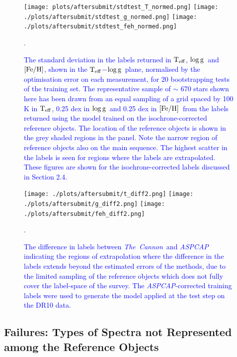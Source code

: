\documentclass[12pt, preprint]{aastex}
\newcommand{\tc}{\textsl{The~Cannon}}
\newcommand{\aspcap}{\textsl{ASPCAP}}
\newcommand{\teff}{\mbox{$\rm T_{eff}$}}
\newcommand{\feh}{\mbox{$\rm [Fe/H]$}}
\newcommand{\logg}{\mbox{$\rm \log g$}}
\begin{document}
\begin{figure}[!h]
\centering
  \texttt{[image: plots/aftersubmit/stdtest\_T\_normed.png]}
    \texttt{[image: ./plots/aftersubmit/stdtest\_g\_normed.png]}
    \texttt{[image: ./plots/aftersubmit/stdtest\_feh\_normed.png]}
    \caption{\textcolor{blue}{The standard deviation in the labels returned in \teff, \logg\ and \feh, shown in the \teff$-$\logg\ plane, normalised by the optimisation error on each measurement, for 20 bootstrapping tests of the training set. The representative sample of $\sim$ 670 stars shown here has been drawn from an equal sampling of a grid spaced by 100 K in \teff, 0.25 dex in \logg\ and 0.25 dex in \feh\ from the labels returned using the model trained on the isochrone-corrected reference objects. The location of the reference objects is shown in the grey shaded regions in the panel. Note the narrow region of reference objects also on the main sequence. The highest scatter in the labels is seen for regions where the labels are extrapolated. These figures are shown for the isochrone-corrected labels discussed in Section 2.4.}}
    \label{fig:sigma}.
\end{figure}



\begin{figure}[!h]
\centering
  \texttt{[image: ./plots/aftersubmit/t\_diff2.png]}
    \texttt{[image: ./plots/aftersubmit/g\_diff2.png]}
    \texttt{[image: ./plots/aftersubmit/feh\_diff2.png]}
    \caption{\textcolor{blue}{The difference in labels between \tc\ and \aspcap\, indicating the regions of extrapolation where the difference in the labels extends beyond the estimated errors of the methods, due to the limited sampling of the reference objects which does not fully cover the label-space of the survey. The \aspcap-corrected training labels were used to generate the model applied at the test step on the DR10 data.}}
    \label{fig:sigma2}.
\end{figure}




\subsection{Failures: Types of Spectra not Represented among the Reference Objects}
\label{sec:AnomalousSpectra}
\end{document}
